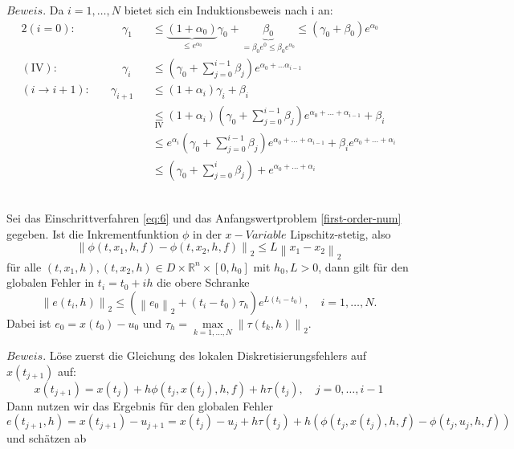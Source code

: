 $Beweis.$ Da $i=1,\dots,N$ bietet sich ein Induktionsbeweis nach i an:
\begin{alignat*}{2}
    (i=0):& \qquad \gamma_1 &&\leq
    \underbrace{(1 + \alpha_0)}_{\leq e^{\alpha_0}}\gamma_0 +
    \underbrace{\beta_0}_{=\beta_0 e^{0} \leq \beta_0 e^{\alpha_0}} \leq (\gamma_0 + \beta_0)e^{\alpha_0}\\
    (\text{IV}):& \qquad
    \gamma_{i} &&\leq \left( \gamma_0 + \sum_{j=0}^{i-1}\beta_j \right) e^{\alpha_0 + \dots \alpha_{i-1}} \\
    (i \rightarrow i+1):& \quad
    \gamma_{i+1} &&\leq (1 + \alpha_{i})\gamma_{i} + \beta_i\\
    & &&\underset{\text{IV}}{\leq} (1 + \alpha_i)
    \left( \gamma_0 + \sum_{j=0}^{i-1}\beta_j \right) e^{\alpha_0 + \dots + \alpha_{i-1}}+\beta_{i}\\
    &  &&\leq e^{\alpha_i} \left( \gamma_0 + \sum_{j=0}^{i-1}\beta_j \right) e^{\alpha_0 + \dots + \alpha_{i-1}}
    + \beta_i e^{\alpha_0 + \dots + \alpha_{i}}\\
    &  &&\leq \left( \gamma_0 +  \sum_{j=0}^{i}\beta_j \right) + e^{\alpha_0 + \dots + \alpha_{i}}
\end{alignat*}\qedwhite\\
\begin{satz}
    \label{one-step-error-bound}
    Sei das Einschrittverfahren \eqref{eq:6} und das Anfangswertproblem \eqref{first-order-num} gegeben. Ist  die
    Inkrementfunktion $\phi$ in der $x-Variable$ Lipschitz-stetig, also
    \[
        \left\lVert \phi(t, x_1, h, f) - \phi(t, x_2, h, f) \right\rVert_2 \leq L \left\lVert x_1 - x_2 \right\rVert_2
    \]
    für alle $(t, x_1, h),(t, x_2, h) \in D \times \mathbb{R}^n \times [0, h_0]$ mit $h_0, L>0$, dann gilt für den
    globalen Fehler in $t_i = t_0 + ih$ die obere Schranke
    \[
        \left\lVert e(t_i,h) \right\rVert_2 \leq \left( \left\lVert e_0 \right\rVert_2 + (t_i-t_0)\tau_h \right)
        e^{L(t_i-t_0)}, \quad i = 1, \dots, N.
    \]
    Dabei ist $e_0 = x(t_0)-u_0$ und $\tau_h= \max\limits_{k=1,\dots,N} \left\lVert \tau(t_k,h) \right\rVert_2 $.
\end{satz}
$Beweis.$ Löse zuerst die Gleichung des lokalen Diskretisierungsfehlers auf $x(t_{j+1})$ auf:
\[
    x(t_{j+1}) = x(t_j) + h \phi(t_j, x(t_j),h,f) + h \tau(t_j), \quad j = 0, \dots , i-1
\]
Dann nutzen wir das Ergebnis für den globalen Fehler
\[
    e(t_{j+1},h) = x(t_{j+1}) - u_{j+1} = x(t_j) - u_j + h \tau(t_j)
    + h \left( \phi(t_j, x(t_j),h,f) - \phi(t_j, u_j, h, f) \right)
\]
und schätzen ab
